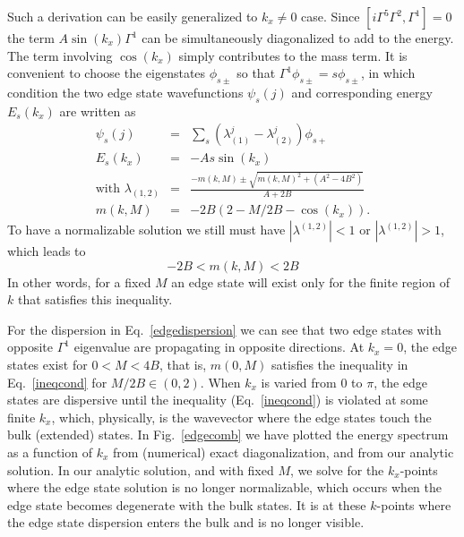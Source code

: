 \documentclass{article}
\begin{document}
Such a derivation can be easily generalized to $k_x\neq 0$ case.
Since $\left[i\Gamma^5\Gamma^2,\Gamma^1\right]=0$ the term
$A\sin(k_x)\Gamma^1$ can be simultaneously diagonalized to add to
the energy. The term involving $\cos(k_x)$ simply contributes to the
mass term. It is convenient to choose the eigenstates $\phi_{s\pm}$
so that $\Gamma^1\phi_{s\pm}=s\phi_{s\pm}$, in which condition the
two edge state wavefunctions $\psi_s(j)$ and corresponding energy
$E_s(k_x)$ are written as
\begin{eqnarray}
\psi_s(j)&=&\sum_s\left(\lambda_{(1)}^j-\lambda_{(2)}^j\right)\phi_{s+}\\
E_s(k_x)&=&
-As\sin(k_x)\label{edgedispersion}\\
\text{with~}\lambda_{(1,2)}&=&\frac{-m(k,M)\pm\sqrt{m(k,M)^2+(A^2-4B^2)}}{A+2B}\nonumber\\
m(k,M)&=&-2B(2-M/2B-\cos (k_x))\nonumber. \end{eqnarray} To have a
normalizable solution we still must have $|\lambda^{(1,2)}|<1$ or
$|\lambda^{(1,2)}|>1$, which leads to
\begin{equation}
-2B<m(k,M)<2B\label{ineqcond}
\end{equation}\noindent In other words, for a fixed $M$ an edge state will
exist only for the finite region of $k$ that satisfies this
inequality.

For the dispersion in Eq.~\ref{edgedispersion} we can see that two
edge states with opposite $\Gamma^1$ eigenvalue are propagating in
opposite directions. At $k_x=0$, the edge states exist for
$0<M<4B$, that is, $m(0,M)$ satisfies the inequality in
Eq.~\ref{ineqcond} for $M/2B\in (0,2)$. When $k_x$ is varied from
$0$ to $\pi$, the edge states are dispersive until the inequality
(Eq.~\ref{ineqcond}) is violated at some finite $k_x$, which,
physically, is the wavevector where the edge states touch the bulk
(extended) states. In Fig.~\ref{edgecomb} we have plotted the
energy spectrum as a function of $k_x$ from (numerical) exact
diagonalization, and from our analytic solution. In our analytic
solution, and with fixed $M$, we solve for the $k_x$-points where
the edge state solution is no longer normalizable, which occurs
when the edge state becomes degenerate with the bulk states. It is
at these $k$-points where the edge state dispersion enters the
bulk and is no longer visible.
\end{document}
